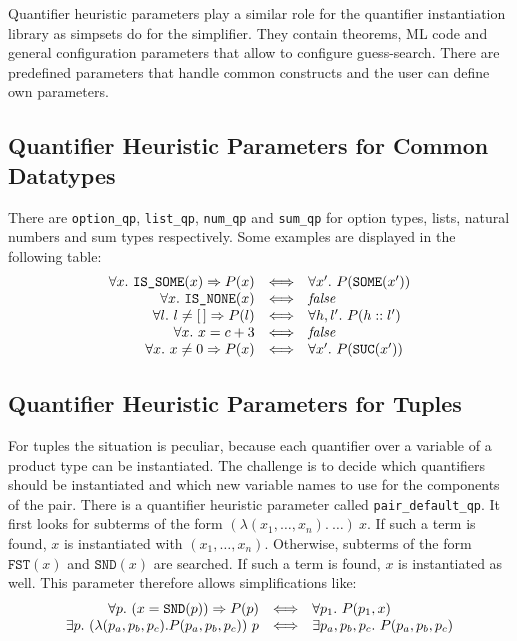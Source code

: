 \documentclass[a4paper,12pt,DIV=12,oneside]{scrbook}
\theoremstyle{definition}
\theoremstyle{remark}
\begin{document}
Quantifier heuristic parameters play a similar role for the quantifier
instantiation library as simpsets do for the simplifier. They contain
theorems, ML code and general configuration parameters that allow to configure
guess-search. There are predefined parameters that handle
common constructs and the user can define own parameters.

\subsection{Quantifier Heuristic Parameters for Common Datatypes}

There are \texttt{option\_qp}, \texttt{list\_qp}, \texttt{num\_qp} and \texttt{sum\_qp} for option types, lists,
natural numbers and sum types respectively.
Some examples are displayed in the following table:
%
\[\begin{array}{r@{\quad \Longleftrightarrow \quad}l}
\forall x.\ \texttt{IS\_SOME}(x) \Rightarrow P(x) & \forall x'.\ P (\texttt{SOME}(x')) \\
\forall x.\ \texttt{IS\_NONE}(x)& \textit{false} \\
\forall l.\ l \neq [\,] \Rightarrow P(l)& \forall h, l'.\ P(h::l')  \\
\forall x.\ x = c + 3& \textit{false} \\
\forall x.\ x \neq 0 \Rightarrow P(x)& \forall x'.\ P(\texttt{SUC}(x'))
\end{array}\]

\subsection{Quantifier Heuristic Parameters for Tuples}

For tuples the situation is peculiar, because each quantifier over a variable of a product type
can be instantiated. The challenge is to decide which quantifiers should be instantiated and
which new variable names to use for the components of the pair.
There is a quantifier heuristic parameter called \texttt{pair\_default\_qp}. It first looks for
subterms of the form $(\lambda (x_1, \ldots, x_n).\ \ldots)\ x$. If such a term is found, $x$ is instantiated with
$(x_1, \ldots, x_n)$. Otherwise, subterms of the form $\texttt{FST}(x)$ and $\texttt{SND}(x)$ are searched. If such a term
is found, $x$ is instantiated as well. This parameter therefore allows simplifications like:
%
\[\begin{array}{r@{\quad \Longleftrightarrow \quad}l}
\forall p.\ (x = \texttt{SND}(p)) \Rightarrow P(p)& \forall p_1.\ P(p_1, x) \\
\exists p.\ (\lambda (p_a, p_b, p_c). P(p_a, p_b, p_c))\ p & \exists p_a, p_b, p_c.\ P(p_a, p_b, p_c)
\end{array}\]
\end{document}
